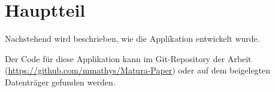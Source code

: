 \chapter{Hauptteil}

Nachstehend wird beschrieben, wie die Applikation entwickelt wurde.

Der Code für diese Applikation kann im Git-Repository der Arbeit (\url{https://github.com/mmathys/Matura-Paper}) oder auf dem beigelegten Datenträger gefunden werden.








% 
